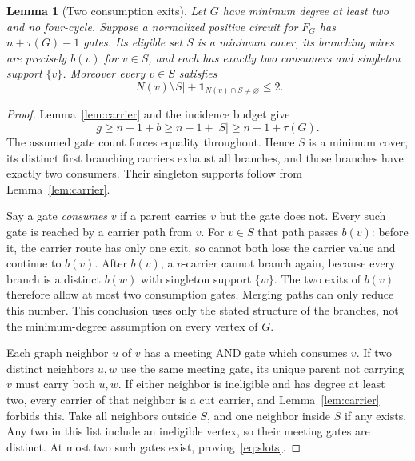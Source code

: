 \documentclass[11pt]{article}
\newtheorem{lemma}[theorem]{Lemma}
\theoremstyle{definition}
\theoremstyle{remark}
\begin{document}
\begin{lemma}[Two consumption exits]\label{lem:slots}
Let $G$ have minimum degree at least two and no four-cycle. Suppose a
normalized positive circuit for $F_G$ has $n+\tau(G)-1$ gates. Its eligible
set $S$ is a minimum cover, its branching wires are precisely $b(v)$ for
$v\in S$, and each has exactly two consumers and singleton support
$\{v\}$. Moreover every $v\in S$ satisfies
\begin{equation}\label{eq:slots}
 |N(v)\setminus S|+\mathbf 1_{N(v)\cap S\ne\varnothing}\le2.
\end{equation}
\end{lemma}
\begin{proof}
Lemma~\ref{lem:carrier} and the incidence budget give
\[
 g\ge n-1+b\ge n-1+|S|\ge n-1+\tau(G).
\]
The assumed gate count forces equality throughout. Hence $S$ is a minimum
cover, its distinct first branching carriers exhaust all branches, and
those branches have exactly two consumers. Their singleton supports follow
from Lemma~\ref{lem:carrier}.

Say a gate \emph{consumes} $v$ if a parent carries $v$ but the gate does not.
Every such gate is reached by a carrier path from $v$. For $v\in S$ that
path passes $b(v)$: before it, the carrier route has only one exit, so
cannot both lose the carrier value and continue to $b(v)$. After $b(v)$,
a $v$-carrier cannot branch again, because every branch is a distinct
$b(w)$ with singleton support $\{w\}$. The two exits of $b(v)$ therefore
allow at most two consumption gates. Merging paths can only reduce this
number. This conclusion uses only the stated structure of the branches,
not the minimum-degree assumption on every vertex of $G$.

Each graph neighbor $u$ of $v$ has a meeting AND gate which consumes $v$.
If two distinct neighbors $u,w$ use the same meeting gate, its unique
parent not carrying $v$ must carry both $u,w$. If either neighbor is
ineligible and has degree at least two, every carrier of that neighbor
is a cut carrier, and Lemma~\ref{lem:carrier} forbids this.
Take all neighbors outside $S$, and one neighbor inside $S$ if any exists.
Any two in this list include an ineligible vertex, so their meeting gates
are distinct. At most two such gates exist, proving~\eqref{eq:slots}.
\end{proof}
\end{document}

